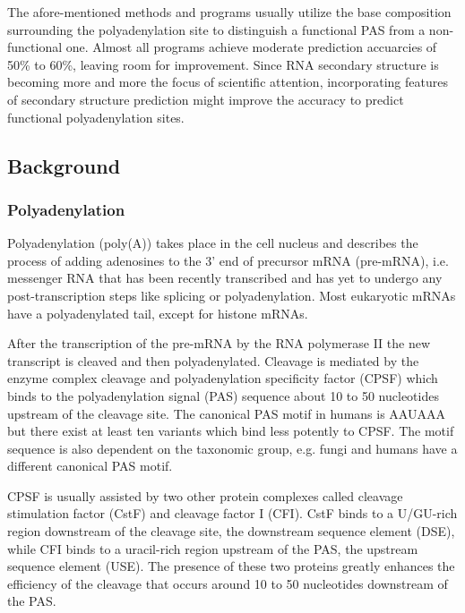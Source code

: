 The afore-mentioned methods and programs usually utilize the base composition surrounding the polyadenylation site to distinguish a functional PAS from a non-functional one. Almost all programs achieve moderate prediction accuarcies of 50\% to 60\%, leaving room for improvement. Since RNA secondary structure is becoming more and more the focus of scientific attention, incorporating features of secondary structure prediction might improve the accuracy to predict functional polyadenylation sites.   

\subsection{Background}

\subsubsection{Polyadenylation}
\label{Polyadenylation}
Polyadenylation (poly(A)) takes place in the cell nucleus and describes the process of adding adenosines to the 3' end of precursor mRNA (pre-mRNA), i.e. messenger RNA that has been recently transcribed and has yet to undergo any post-transcription steps like splicing or polyadenylation. Most eukaryotic mRNAs have a polyadenylated tail, except for histone mRNAs. 

After the transcription of the pre-mRNA by the RNA polymerase II the new transcript is cleaved and then polyadenylated. Cleavage is mediated by the enzyme complex cleavage and polyadenylation specificity factor (CPSF) which binds to the polyadenylation signal (PAS) sequence about 10 to 50 nucleotides upstream of the cleavage site. The canonical PAS motif in humans is AAUAAA but there exist at least ten variants which bind less potently to CPSF. The motif sequence is also dependent on the taxonomic group, e.g. fungi and humans have a different canonical PAS motif. 

CPSF is usually assisted by two other protein complexes called cleavage stimulation factor (CstF) and cleavage factor I (CFI). CstF binds to a U/GU-rich region downstream of the cleavage site, the downstream sequence element (DSE), while CFI binds to a uracil-rich region upstream of the PAS, the upstream sequence element (USE). The presence of these two proteins greatly enhances the efficiency of the cleavage that occurs around 10 to 50 nucleotides downstream of the PAS.

